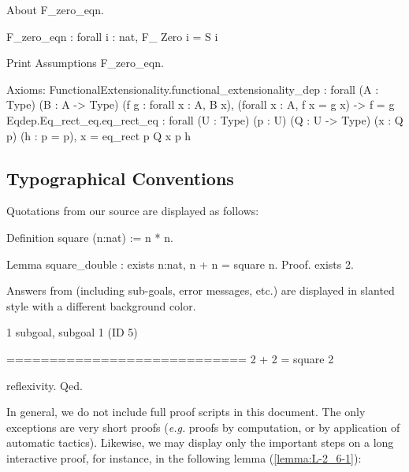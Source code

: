\documentclass[a4paper]{book}
\begin{document}
\begin{Coqsrc}
About F_zero_eqn.
\end{Coqsrc}

\begin{Coqanswer}
F_zero_eqn : forall i : nat, F_ Zero i = S i
\end{Coqanswer}

\begin{Coqsrc}
Print Assumptions F_zero_eqn. 
\end{Coqsrc}

\begin{Coqanswer}
Axioms:
FunctionalExtensionality.functional_extensionality_dep
  : forall (A : Type) (B : A -> Type) (f g : forall x : A, B x),
    (forall x : A, f x = g x) -> f = g
Eqdep.Eq_rect_eq.eq_rect_eq
  : forall (U : Type) (p : U) (Q : U -> Type) (x : Q p) (h : p = p),
    x = eq_rect p Q x p h
\end{Coqanswer}





\subsection{Typographical Conventions}

Quotations from our  \coq{} source are displayed as follows:


  \begin{Coqsrc}
 Definition square (n:nat) := n * n.

 Lemma square_double : exists n:nat, n + n = square n.
 Proof.
    exists 2. 
  \end{Coqsrc}

Answers from \coq{} (including sub-goals, error messages, etc.) are displayed in slanted style
with a different background color.



 \begin{Coqanswer}
 1 subgoal, subgoal 1 (ID 5)
  
  ============================
   2 + 2 = square 2
   
 \end{Coqanswer}

 \begin{Coqsrc}
   reflexivity.
Qed.
 \end{Coqsrc}

In general, we do not include full proof scripts in this document. The only exceptions are very short proofs (\emph{e.g.} proofs by computation, or by application of automatic tactics). Likewise, we may display only the important steps on a long interactive proof, for instance, in the following lemma (\vref{lemma:L-2_6-1}):
\end{document}
